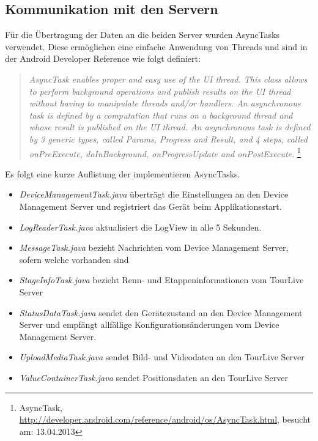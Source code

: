 \subsection{Kommunikation mit den Servern}
Für die Übertragung der Daten an die beiden Server wurden AsyncTasks verwendet. Diese ermöglichen eine einfache Anwendung von Threads und sind in der Android Developer Reference wie folgt definiert: 

\begin{quotation}
\textit{AsyncTask enables proper and easy use of the UI thread. This class allows to perform background operations and publish results on the UI thread without having to manipulate threads and/or handlers. An asynchronous task is defined by a computation that runs on a background thread and whose result is published on the UI thread. An asynchronous task is defined by 3 generic types, called Params, Progress and Result, and 4 steps, called onPreExecute, doInBackground, onProgressUpdate and onPostExecute.} \footnote{AsyncTask, \url{http://developer.android.com/reference/android/os/AsyncTask.html}, besucht am: 13.04.2013}
\end{quotation}

Es folgt eine kurze Auflistung der implementieren AsyncTasks.
\begin{itemize} [noitemsep,topsep=0pt]
	\item \textit{DeviceManagementTask.java} überträgt die Einstellungen an den Device Management Server und registriert das Gerät beim Applikationsstart.
	\item \textit{LogReaderTask.java} aktualisiert die LogView in alle 5 Sekunden.
	\item \textit{MessageTask.java} bezieht Nachrichten vom Device Management Server, sofern welche vorhanden sind
	\item \textit{StageInfoTask.java} bezieht Renn- und Etappeninformationen vom TourLive Server
	\item \textit{StatusDataTask.java} sendet den Gerätezustand an den Device Management Server und empfängt allfällige Konfigurationsänderungen vom Device Management Server. 
	\item \textit{UploadMediaTask.java} sendet Bild- und Videodaten an den TourLive Server
	\item \textit{ValueContainerTask.java} sendet Positionsdaten an den TourLive Server
\end{itemize}

